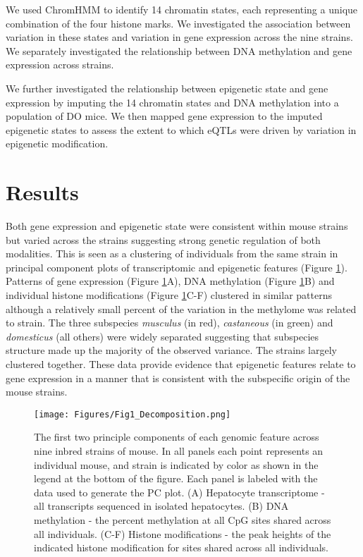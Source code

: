 \documentclass[
  11pt,
]{article}
\begin{document}
We used ChromHMM \citep{Ernst:2012ii} to identify 14 chromatin states,
each representing a unique combination of the four histone marks. We
investigated the association between variation in these states and
variation in gene expression across the nine strains. We separately
investigated the relationship between DNA methylation and gene
expression across strains.

We further investigated the relationship between epigenetic state and
gene expression by imputing the 14 chromatin states and DNA methylation
into a population of DO mice. We then mapped gene expression to the
imputed epigenetic states to assess the extent to which eQTLs were
driven by variation in epigenetic modification.

\hypertarget{results}{%
\section{Results}\label{results}}

Both gene expression and epigenetic state were consistent within mouse
strains but varied across the strains suggesting strong genetic
regulation of both modalities. This is seen as a clustering of
individuals from the same strain in principal component plots of
transcriptomic and epigenetic features (Figure \ref{fig:pc_plots}).
Patterns of gene expression (Figure \ref{fig:pc_plots}A), DNA
methylation (Figure \ref{fig:pc_plots}B) and individual histone
modifications (Figure \ref{fig:pc_plots}C-F) clustered in similar
patterns although a relatively small percent of the variation in the
methylome was related to strain. The three subspecies \textit{musculus}
(in red), \textit{castaneous} (in green) and \textit{domesticus} (all
others) were widely separated suggesting that subspecies structure made
up the majority of the observed variance. The  strains
largely clustered together. These data provide evidence that epigenetic
features relate to gene expression in a manner that is consistent with
the subspecific origin of the mouse strains.

\begin{figure}[ht!]
\texttt{[image: Figures/Fig1\_Decomposition.png]} 
\caption{The first two principle components of each genomic 
feature across nine inbred strains of mouse. In all panels 
each point represents an individual mouse, and strain is 
indicated by color as shown in the legend at the bottom of 
the figure. Each panel is labeled with the data used to 
generate the PC plot. (A) Hepatocyte transcriptome - all 
transcripts sequenced in isolated hepatocytes. (B) DNA 
methylation - the percent methylation at all CpG sites 
shared across all individuals. (C-F) Histone modifications - 
the peak heights of the indicated histone modification for 
sites shared across all individuals.}
\label{fig:pc_plots}
\end{figure}
\end{document}
